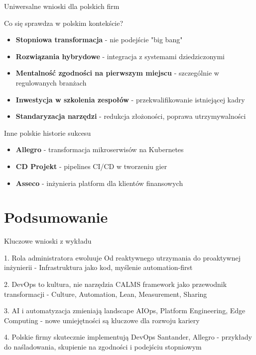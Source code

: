 \documentclass[10pt, aspectratio=169]{beamer}
\begin{document}
\begin{frame}{Uniwersalne wnioski dla polskich firm}
\begin{block}{Co się sprawdza w polskim kontekście?}
\begin{itemize}
\item \textbf{Stopniowa transformacja} - nie podejście "big bang"
\item \textbf{Rozwiązania hybrydowe} - integracja z systemami dziedziczonymi
\item \textbf{Mentalność zgodności na pierwszym miejscu} - szczególnie w regulowanych branżach  
\item \textbf{Inwestycja w szkolenia zespołów} - przekwalifikowanie istniejącej kadry
\item \textbf{Standaryzacja narzędzi} - redukcja złożoności, poprawa utrzymywalności
\end{itemize}
\end{block}

\begin{exampleblock}{Inne polskie historie sukcesu}
\begin{itemize}
\item \textbf{Allegro} - transformacja mikroserwisów na Kubernetes
\item \textbf{CD Projekt} - pipelines CI/CD w tworzeniu gier
\item \textbf{Asseco} - inżynieria platform dla klientów finansowych
\end{itemize}
\end{exampleblock}
\end{frame}

\section{Podsumowanie}

\begin{frame}{Kluczowe wnioski z wykładu}
\begin{alertblock}{1. Rola administratora ewoluuje}
Od reaktywnego utrzymania do proaktywnej inżynierii - Infrastruktura jako kod, myślenie automation-first
\end{alertblock}

\begin{block}{2. DevOps to kultura, nie narzędzia}
CALMS framework jako przewodnik transformacji - Culture, Automation, Lean, Measurement, Sharing
\end{block}

\begin{exampleblock}{3. AI i automatyzacja zmieniają landscape}
AIOps, Platform Engineering, Edge Computing - nowe umiejętności są kluczowe dla rozwoju kariery
\end{exampleblock}

\begin{alertblock}{4. Polskie firmy skutecznie implementują DevOps}
Santander, Allegro - przykłady do naśladowania, skupienie na zgodności i podejściu stopniowym
\end{alertblock}
\end{frame}
\end{document}

